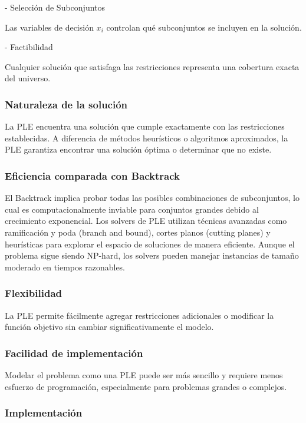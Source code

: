 \documentclass{article}
\begin{document}
- Selección de Subconjuntos

Las variables de decisión $x_i$ controlan qué subconjuntos se incluyen en la solución.

- Factibilidad

Cualquier solución que satisfaga las restricciones representa una cobertura exacta del universo.

\subsubsection{Naturaleza de la solución}

La PLE encuentra una solución que cumple exactamente con las restricciones establecidas. A diferencia de métodos heurísticos o algoritmos aproximados, la PLE garantiza encontrar una solución óptima o determinar que no existe.


\subsubsection{Eficiencia comparada con Backtrack}

El Backtrack implica probar todas las posibles combinaciones de subconjuntos, lo cual es computacionalmente inviable para conjuntos grandes debido al crecimiento exponencial. Los solvers de PLE utilizan técnicas avanzadas como ramificación y poda (branch and bound), cortes planos (cutting planes) y heurísticas para explorar el espacio de soluciones de manera eficiente. Aunque el problema sigue siendo NP-hard, los solvers pueden manejar instancias de tamaño moderado en tiempos razonables.

\subsubsection{Flexibilidad}

La PLE permite fácilmente agregar restricciones adicionales o modificar la función objetivo sin cambiar significativamente el modelo.

\subsubsection{Facilidad de implementación}

Modelar el problema como una PLE puede ser más sencillo y requiere menos esfuerzo de programación, especialmente para problemas grandes o complejos.

\subsubsection{Implementación}
\end{document}
